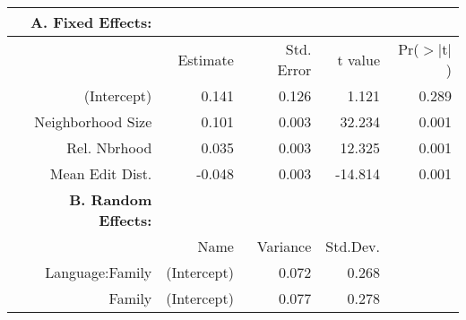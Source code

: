 \begin{tabular}{rrrrr}
 {\bf A. Fixed Effects:} \\
\hline
 & Estimate & Std. Error & t value & Pr($>$$|$t$|$) \\ 
  \hline
(Intercept) & 0.141 & 0.126 & 1.121 & 0.289 \\ 
  Neighborhood Size & 0.101 & 0.003 & 32.234 & 0.001 \\ 
  Rel. Nbrhood & 0.035 & 0.003 & 12.325 & 0.001 \\ 
  Mean Edit Dist. & -0.048 & 0.003 & -14.814 & 0.001 \\ 

\hline \hline
{\bf B. Random Effects:} \\
\hline
& Name & Variance & Std.Dev. \\
\hline
Language:Family & (Intercept) & 0.072 & 0.268 \\
Family & (Intercept) & 0.077 & 0.278 \\
\end{tabular}
